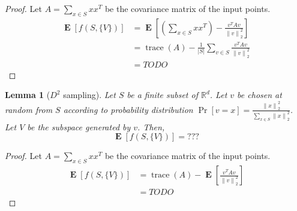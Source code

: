 \documentclass{article}
\newtheorem{lemma}[theorem]{Lemma}
\newcommand{\R}{\mathbb{R}}
\newcommand{\norm}[1]{\left\|#1\right\|}
\DeclareMathOperator*{\trace}{trace}
\DeclareMathOperator*{\Exp}{\mathbf{E}}
\begin{document}
\begin{proof}
Let $A = \sum_{x \in S} xx^T$ be the covariance matrix of the input points.
\begin{align*}
\Exp[f(S, \{V\})]
& = \Exp\left[ \left(\sum_{x \in S} xx^T \right) - \frac{v^TAv}{\norm{v}_2^2} \right] \\
& = \trace(A) - \frac{1}{|S|} \sum_{v \in S} \frac{v^TAv}{\norm{v}_2^2} \\
& = TODO
\end{align*}
\end{proof}

\begin{lemma}[$D^2$ sampling]
Let $S$ be a finite subset of $\R^d$. Let $v$ be chosen at random from $S$
according to probability distribution $\Pr[v = x] = \frac{\norm{x}_2^2}{\sum_{x \in S} \norm{x}_2^2}$.
Let $V$ be the subspace generated by $v$. Then,
$$
\Exp[f(S,\{V\})] = ???
$$
\end{lemma}

\begin{proof}
Let $A = \sum_{x \in S} xx^T$ be the covariance matrix of the input points.
\begin{align*}
\Exp[f(S, \{V\})]
& = \trace(A) - \Exp\left[ \frac{v^TAv}{\norm{v}_2^2} \right] \\
& = TODO
\end{align*}
\end{proof}
\end{document}
